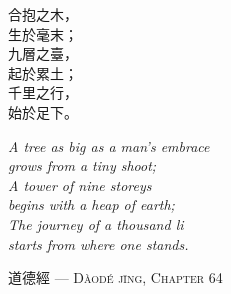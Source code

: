 \pagecolor{bg}
\thispagestyle{empty}
\text{}
\vfill

\noindent
\begin{minipage}[t]{0.35\textwidth}
	\begin{flushright}
	\textcolor{goban}{	\large
		合抱之木，\\
		生於毫末；\\[0.5em]
		九層之臺，\\
		起於累土；\\[0.5em]
		千里之行，\\
		始於足下。}
	\end{flushright}
\end{minipage}%
\hfill
{\color{goban}\vrule}
\hfill
\begin{minipage}[t]{0.48\textwidth}
	\raggedright
	\textcolor{goban}{\emph{
			$\!\!$A tree as big as a man's embrace\\
			grows from a tiny shoot;\\[0.5em]
			A tower of nine storeys\\
			begins with a heap of earth;\\[0.5em]
			The journey of a thousand li\\
			starts from where one stands. }
	}
\end{minipage}
\vspace{1em}

\hfill {\textcolor{goban}{道德經 — \textsc{Dàodé jīng, Chapter 64}}}

\vfill

